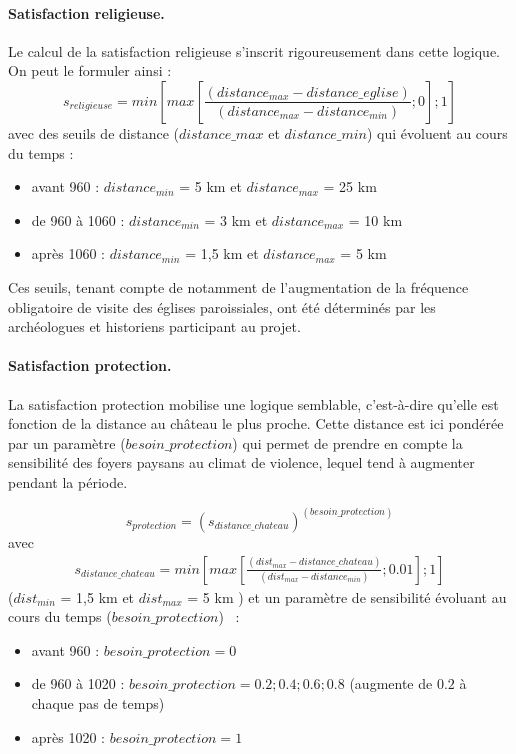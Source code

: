 \paragraph{Satisfaction religieuse.}
		
Le calcul de la satisfaction religieuse s'inscrit rigoureusement dans cette logique.
On peut le formuler ainsi :
		\begin{equation*}
		s_{religieuse} = min \left \lbrack max \left \lbrack \frac{(distance_{max} - distance\_eglise)}{(distance_{max} -distance_{min})}; 0 \right \rbrack ; 1 \right \rbrack
		\end{equation*}
avec des seuils de distance ($distance\_max$ et $distance\_min$) qui évoluent au cours du temps :
\begin{itemize}
	\item avant 960 : $distance_{min}$ = 5 km et $distance_{max}$ = 25 km
	\item de 960 à 1060 : $distance_{min}$ = 3 km et $distance_{max}$ = 10 km
	\item après 1060 : $distance_{min}$ = 1,5 km et $distance_{max}$ = 5 km
\end{itemize}
Ces seuils, tenant compte de notamment de l'augmentation de la fréquence obligatoire de visite des églises paroissiales, ont été déterminés par les archéologues et historiens participant au projet.

	
\paragraph{Satisfaction \og protection\fg{}.}	

La satisfaction \og protection\fg{} mobilise une logique semblable, c'est-à-dire qu'elle est fonction de la distance au château le plus proche.
Cette distance est ici pondérée par un paramètre ($besoin\_protection$) qui permet de prendre en compte la sensibilité des foyers paysans au climat de violence, lequel tend à augmenter pendant la période.

\begin{equation*}
s_{protection} = (s_{distance\_chateau})^{(besoin\_protection)}
\end{equation*}
avec
\begin{equation*}
\begin{gathered}
s_{distance\_chateau} = min \left \lbrack
max \left \lbrack \frac{(dist_{max} - distance\_chateau)}{(dist_{max} -distance_{min})}; 0.01 \right \rbrack ; 1 \right \rbrack
\end{gathered}
\end{equation*}
($dist_{min}$ = 1,5 km et $dist_{max}$ = 5 km )
et un paramètre de sensibilité évoluant au cours du temps ($besoin\_protection$)  :
\begin{itemize}
	\item avant 960 : $besoin\_protection = 0 $
	\item de 960 à 1020 : $besoin\_protection = 0.2 ; 0.4 ; 0.6 ; 0.8$ (augmente de $0.2$ à chaque pas de temps)
	\item après 1020 : $besoin\_protection = 1$
\end{itemize}

